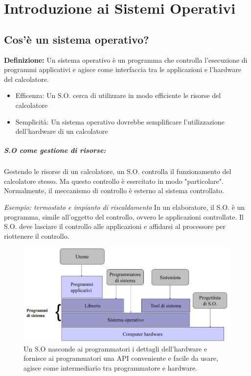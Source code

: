 \chapter{Introduzione ai Sistemi Operativi}
\newpage

\section{Cos'è un sistema operativo? }

\textbf{Definizione:} Un sistema operativo è un programma che controlla l'esecuzione di
programmi applicativi e agisce come interfaccia tra le applicazioni e l'hardware del calcolatore.


\begin{itemize}
    \item Efficenza: Un S.O. cerca di utilizzare in modo efficiente le risorse del calcolatore
    \item Semplicità: Un sistema operativo dovrebbe semplificare l'utilizzazione dell'hardware di
    un calcolatore
\end{itemize}

\paragraph{S.O come gestione di risorse:}
Gestendo le risorse di un calcolatore, un S.O. controlla il
funzionamento del calcolatore stesso. Ma questo controllo è esercitato in modo "particolare".
Normalmente, il meccanismo di controllo è esterno al sistema controllato.

\textit{Esempio: termostato e impianto di riscaldamento}
\newline
In un elaboratore, il S.O. è un programma, simile all'oggetto del controllo, ovvero le applicazioni controllate. Il S.O. deve lasciare il controllo alle applicazioni e affidarsi al
processore per riottenere il controllo.

\begin{figure} [h]
    \centering
    \includegraphics[width=0.7\linewidth]{Images/Screenshot 2024-12-15 at 18-55-32 so-01-intro-os.pptx - so-01-intro-os.pdf.png}
    \caption{Un S.O nasconde ai programmatori i dettagli dell'hardware e fornisce ai programmatori una API conveniente e facile da usare, agisce come intermediario tra programmatore e hardware.}
     \label{fig:Figura1}
\end{figure}

